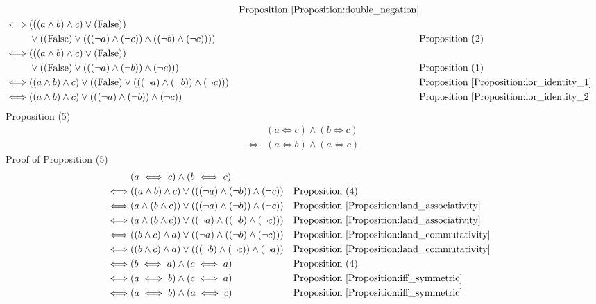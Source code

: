 \begin{prop}
\begin{align*}
& & \text{Proposition \ref{Proposition:double_negation}} \\
\iff & (((a \land b) \land c) \lor (\text{False})) \\
& \lor ((\text{False}) \lor (((\lnot a) \land (\lnot c)) \land ((\lnot b) \land (\lnot c))))
& & \text{Proposition (2)} \\
\iff & (((a \land b) \land c) \lor (\text{False})) \\
& \lor ((\text{False}) \lor (((\lnot a) \land (\lnot b)) \land (\lnot c)))
& & \text{Proposition (1)} \\
\iff & ((a \land b) \land c) \lor ((\text{False}) \lor (((\lnot a) \land (\lnot b)) \land (\lnot c)))
& & \text{Proposition \ref{Proposition:lor_identity_1}} \\
\iff & ((a \land b) \land c) \lor (((\lnot a) \land (\lnot b)) \land (\lnot c))
& & \text{Proposition \ref{Proposition:lor_identity_2}} \\
\end{align*}
Proposition (5)
\begin{align*}
& (a \iff c) \land (b \iff c) \\
\iff & (a \iff b) \land (a \iff c)
\end{align*}
Proof of Proposition (5)
\begin{align*}
& (a \iff c) \land (b \iff c) \\
\iff & ((a \land b) \land c) \lor (((\lnot a) \land (\lnot b)) \land (\lnot c))
& & \text{Proposition (4)} \\
\iff & (a \land (b \land c)) \lor (((\lnot a) \land (\lnot b)) \land (\lnot c))
& & \text{Proposition \ref{Proposition:land_associativity}} \\
\iff & (a \land (b \land c)) \lor ((\lnot a) \land ((\lnot b) \land (\lnot c)))
& & \text{Proposition \ref{Proposition:land_associativity}} \\
\iff & ((b \land c) \land a) \lor ((\lnot a) \land ((\lnot b) \land (\lnot c)))
& & \text{Proposition \ref{Proposition:land_commutativity}} \\
\iff & ((b \land c) \land a) \lor (((\lnot b) \land (\lnot c)) \land (\lnot a))
& & \text{Proposition \ref{Proposition:land_commutativity}} \\
\iff & (b \iff a) \land (c \iff a)
& & \text{Proposition (4)} \\
\iff & (a \iff b) \land (c \iff a)
& & \text{Proposition \ref{Proposition:iff_symmetric}} \\
\iff & (a \iff b) \land (a \iff c)
& & \text{Proposition \ref{Proposition:iff_symmetric}} \\

\end{align*}
\end{prop}
